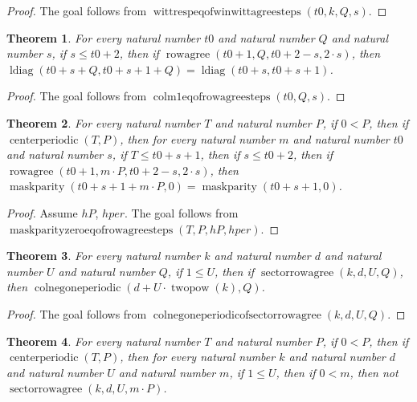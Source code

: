 \documentclass[11pt]{article}
\newtheorem{theorem}{Theorem}[section]
\theoremstyle{definition}
\begin{document}
\begin{proof}
The goal follows from \(\operatorname{wittrespeqofwinwittagreesteps}(t0, k, Q, s)\).
\end{proof}
\begin{theorem}
\label{ll:paper:colm1-eq-of-rowagree-steps}
For every natural number \(t0\) and natural number \(Q\) and natural number \(s\), if \(s \le t0 + 2\), then if \(\operatorname{rowagree}(t0 + 1, Q, t0 + 2 - s, 2 \cdot s)\), then \(\operatorname{ldiag}(t0 + s + Q, t0 + s + 1 + Q) = \operatorname{ldiag}(t0 + s, t0 + s + 1)\).
\end{theorem}
\begin{proof}
The goal follows from \(\operatorname{colm1eqofrowagreesteps}(t0, Q, s)\).
\end{proof}
\begin{theorem}
\label{ll:paper:maskparity-zero-eq-of-rowagree-steps}
For every natural number \(T\) and natural number \(P\), if \(0 < P\), then if \(\operatorname{centerperiodic}(T, P)\), then for every natural number \(m\) and natural number \(t0\) and natural number \(s\), if \(T \le t0 + s + 1\), then if \(s \le t0 + 2\), then if \(\operatorname{rowagree}(t0 + 1, m \cdot P, t0 + 2 - s, 2 \cdot s)\), then \(\operatorname{maskparity}(t0 + s + 1 + m \cdot P, 0) = \operatorname{maskparity}(t0 + s + 1, 0)\).
\end{theorem}
\begin{proof}
Assume \(hP\), \(hper\).
The goal follows from \(\operatorname{maskparityzeroeqofrowagreesteps}(T, P, hP, hper)\).
\end{proof}
\begin{theorem}
\label{ll:paper:colnegoneperiodic-of-sector-rowagree}
For every natural number \(k\) and natural number \(d\) and natural number \(U\) and natural number \(Q\), if \(1 \le U\), then if \(\operatorname{sectorrowagree}(k, d, U, Q)\), then \(\operatorname{colnegoneperiodic}(d + U \cdot \operatorname{twopow}(k), Q)\).
\end{theorem}
\begin{proof}
The goal follows from \(\operatorname{colnegoneperiodicofsectorrowagree}(k, d, U, Q)\).
\end{proof}
\begin{theorem}
\label{ll:paper:not-sector-rowagree-mul}
For every natural number \(T\) and natural number \(P\), if \(0 < P\), then if \(\operatorname{centerperiodic}(T, P)\), then for every natural number \(k\) and natural number \(d\) and natural number \(U\) and natural number \(m\), if \(1 \le U\), then if \(0 < m\), then not \(\operatorname{sectorrowagree}(k, d, U, m \cdot P)\).
\end{theorem}
\end{document}
